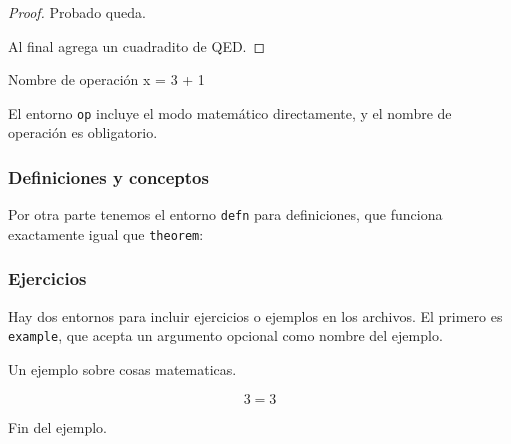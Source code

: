 \begin{LTXexample}[pos=r]
\begin{lemma}
\end{lemma}

\begin{corol}[Coro]
\end{corol}

\begin{prop}
\end{prop}

\begin{axiom}
\end{axiom}

\begin{proof}
Probado queda.

Al final agrega un cuadradito de QED.
\end{proof}

\begin{op}{Nombre de operación}
x = 3 + 1
\end{op}
\end{LTXexample}

El entorno \texttt{op} incluye el modo matemático directamente, y el nombre de operación es obligatorio.

\subsubsection{Definiciones y conceptos}

Por otra parte tenemos el entorno \texttt{defn} para definiciones, que funciona exactamente igual que \texttt{theorem}:

\begin{LTXexample}[pos=r]
\begin{defn}
\end{defn}
\end{LTXexample}

\subsubsection{Ejercicios}
\label{sec:Ejercicios}

Hay dos entornos para incluir ejercicios o ejemplos en los archivos. El primero es \texttt{example}, que acepta un argumento opcional como nombre del ejemplo.

\begin{LTXexample}[pos=r]
\begin{example}[Titulo]
Un ejemplo sobre cosas matematicas.

\[ 3 = 3 \]

Fin del ejemplo.
\end{example}
\end{LTXexample}

